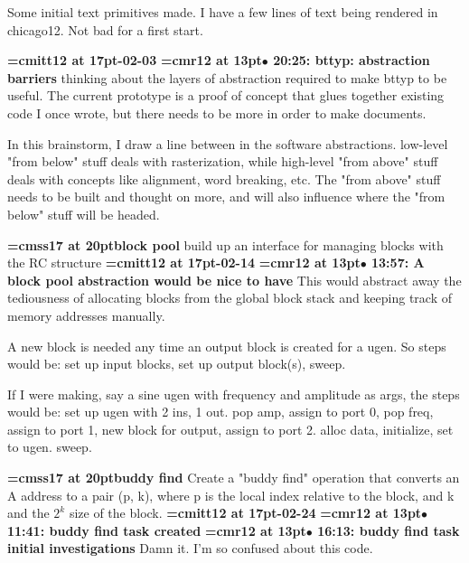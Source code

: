 Some initial text primitives made. I have a few lines of text being rendered in chicago12. Not bad for a first start.
\par

{\medskip\noindent\bf\font\titlefont=cmitt12 at 17pt-02-03}\medskip
{\smallskip\noindent\bf\font\titlefont=cmr12 at 13pt\titlefont $\bullet$ 20:25: bttyp: abstraction barriers}\smallskip
thinking about the layers of abstraction required to make bttyp to be useful. The current prototype is a proof of concept that glues together existing code I once wrote, but there needs to be more in order to make documents.
\par

In this brainstorm, I draw a line between in the software abstractions. low-level "from below" stuff deals with rasterization, while high-level "from above" stuff deals with concepts like alignment, word breaking, etc. The "from above" stuff needs to be built and thought on more, and will also influence where the "from below" stuff will be headed.
\par

{\medskip\noindent\bf\font\titlefont=cmss17 at 20pt\titlefont block pool}\medskip
build up an interface for managing blocks with the RC structure
{\medskip\noindent\bf\font\titlefont=cmitt12 at 17pt-02-14}\medskip
{\smallskip\noindent\bf\font\titlefont=cmr12 at 13pt\titlefont $\bullet$ 13:57: A block pool abstraction would be nice to have}\smallskip
This would abstract away the tediousness of allocating blocks from the global block stack and keeping track of memory addresses manually.
\par

A new block is needed any time an output block is created for a ugen. So steps would be: set up input blocks, set up output block(s), sweep.
\par

If I were making, say a sine ugen with frequency and amplitude as args, the steps would be: set up ugen with 2 ins, 1 out. pop amp, assign to port 0, pop freq, assign to port 1, new block for output, assign to port 2. alloc data, initialize, set to ugen. sweep.
\par

{\medskip\noindent\bf\font\titlefont=cmss17 at 20pt\titlefont buddy find}\medskip
Create a "buddy find" operation that converts an A
address to a pair (p, k), where p is the local index
relative to the block, and k and the $2^k$ size of the block.
{\medskip\noindent\bf\font\titlefont=cmitt12 at 17pt-02-24}\medskip
{\smallskip\noindent\bf\font\titlefont=cmr12 at 13pt\titlefont $\bullet$ 11:41: buddy find task created}\smallskip
{\smallskip\noindent\bf\font\titlefont=cmr12 at 13pt\titlefont $\bullet$ 16:13: buddy find task initial investigations}\smallskip
Damn it. I'm so confused about this code.
\par

